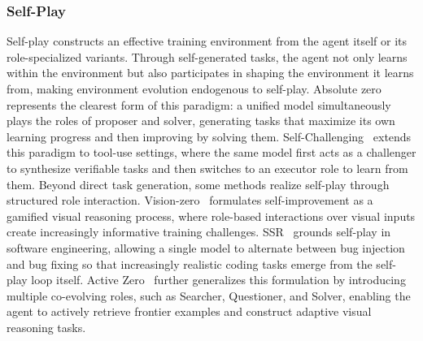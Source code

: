 \subsubsection{Self-Play}\label{sec:self-play}
Self-play constructs an effective training environment from the agent itself or its role-specialized variants.
Through self-generated tasks, the agent not only learns within the environment but also participates in shaping the environment it learns from, making environment evolution endogenous to self-play.
%
Absolute zero~\cite{Absolute_zero} represents the clearest form of this paradigm: a unified model simultaneously plays the roles of proposer and solver, generating tasks that maximize its own learning progress and then improving by solving them.
Self-Challenging~\cite{Self-Challenging} extends this paradigm to tool-use settings, where the same model first acts as a challenger to synthesize verifiable tasks and then switches to an executor role to learn from them.
%
Beyond direct task generation, some methods realize self-play through structured role interaction.
Vision-zero~\cite{Vision-zero} formulates self-improvement as a gamified visual reasoning process, where role-based interactions over visual inputs create increasingly informative training challenges.
SSR~\cite{SSR} grounds self-play in software engineering, allowing a single model to alternate between bug injection and bug fixing so that increasingly realistic coding tasks emerge from the self-play loop itself.
Active Zero~\cite{Active_Zero} further generalizes this formulation by introducing multiple co-evolving roles, such as Searcher, Questioner, and Solver, enabling the agent to actively retrieve frontier examples and construct adaptive visual reasoning tasks.
%
